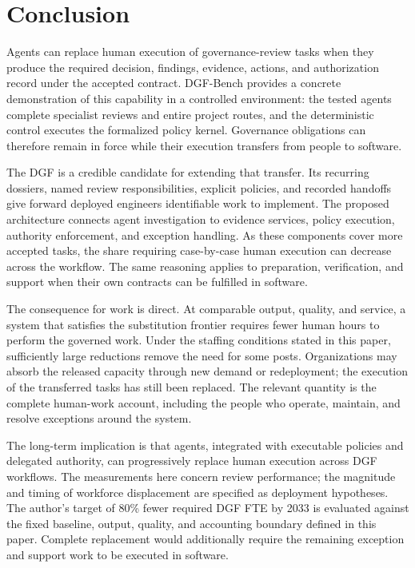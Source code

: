 \section{Conclusion}

Agents can replace human execution of governance-review tasks when they produce the required
decision, findings, evidence, actions, and authorization record under the accepted contract.
DGF-Bench provides a concrete demonstration of this capability in a controlled environment:
the tested agents complete specialist reviews and entire project routes, and the deterministic
control executes the formalized policy kernel. Governance obligations can therefore remain in
force while their execution transfers from people to software.

The DGF is a credible candidate for extending that transfer. Its recurring dossiers, named
review responsibilities, explicit policies, and recorded handoffs give forward deployed
engineers identifiable work to implement. The proposed architecture connects agent
investigation to evidence services, policy execution, authority enforcement, and exception
handling. As these components cover more accepted tasks, the share requiring case-by-case
human execution can decrease across the workflow. The same reasoning applies to preparation,
verification, and support when their own contracts can be fulfilled in software.

The consequence for work is direct. At comparable output, quality, and service, a system that
satisfies the substitution frontier requires fewer human hours to perform the governed work.
Under the staffing conditions stated in this paper, sufficiently large reductions remove the
need for some posts. Organizations may absorb the released capacity through new demand or
redeployment; the execution of the transferred tasks has still been replaced. The relevant
quantity is the complete human-work account, including the people who operate, maintain, and
resolve exceptions around the system.

The long-term implication is that agents, integrated with executable policies and delegated
authority, can progressively replace human execution across DGF workflows. The measurements
here concern review performance; the magnitude and timing of workforce displacement are
specified as deployment hypotheses. The author's target of 80\% fewer required DGF FTE by
2033 is evaluated against the fixed baseline, output, quality, and accounting boundary
defined in this paper. Complete replacement would additionally require the remaining
exception and support work to be executed in software.

